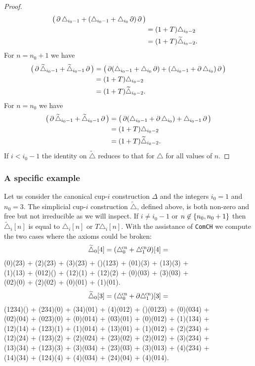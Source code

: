 \begin{proof}
\begin{align*}
		\big(\operatorname{\partial}\triangle_{i_0-1} + (\triangle_{i_0-1} + \triangle_{i_0} \operatorname{\partial})\operatorname{\partial}\big) \\ &=
		(1+T)\triangle_{i_0-2} \\ &=
		(1+T)\widetilde\triangle_{i_0-2}.
	\end{align*}
	For $n = n_0+1$ we have
	\begin{align*}
		\big(\operatorname{\partial}\widetilde\triangle_{i_0-1} + \widetilde\triangle_{i_0-1} \operatorname{\partial}\big) &=
		\big(\operatorname{\partial}(\triangle_{i_0-1} + \triangle_{i_0} \operatorname{\partial}) + (\triangle_{i_0-1} + \operatorname{\partial}\triangle_{i_0})\operatorname{\partial} \big) \\ &=
		(1+T)\triangle_{i_0-2} \\ &=
		(1+T)\widetilde\triangle_{i_0-2}.
	\end{align*}
	For $n = n_0$ we have
	\begin{align*}
		\big(\operatorname{\partial}\widetilde\triangle_{i_0-1} + \widetilde\triangle_{i_0-1} \operatorname{\partial}\big) &=
		\big(\operatorname{\partial}(\triangle_{i_0-1} + \operatorname{\partial}\triangle_{i_0}) + \triangle_{i_0-1}\operatorname{\partial} \big) \\ &=
		(1+T)\triangle_{i_0-2} \\ &=
		(1+T)\widetilde\triangle_{i_0-2}.
	\end{align*}
	If $i<i_0-1$ the identity on $\widetilde\triangle$ reduces to that for $\triangle$ for all values of $n$.
\end{proof}

\subsubsection{A specific example}

Let us consider the canonical \mbox{cup-$i$} construction $\Delta$ and the integers $i_0=1$ and $n_0=3$.
The simplicial \mbox{cup-$i$} construction $\widetilde\triangle$, defined above, is both non-zero and free but not irreducible as we will inspect.
If $i \neq i_0-1$ or $n \not\in \{n_0,n_0+1\}$ then $\widetilde\triangle_i[n]$ is equal to $\triangle_i[n]$ or $T\triangle_i[n]$.
With the assistance of \texttt{ComCH} we compute the two cases where the axioms could be broken:
\[
\widetilde\triangle_0[4] = (\triangle^{\!\mathrm{cn}}_0 + \triangle^{\!\mathrm{cn}}_1\partial)[4] =
\]
\noindent
{\ttfamily
	(0)(23) + (2)(23) + (3)(23) + ()(123) + (01)(3) + (13)(3) +\\
	(1)(13) + (012)() + (12)(1) + (12)(2) + (0)(03) + (3)(03) +\\
	(02)(0) + (2)(02) + (0)(01) + (1)(01).}
\[
\widetilde\triangle_0[3] = (\triangle^{\!\mathrm{cn}}_0 + \partial\triangle^{\!\mathrm{cn}}_1)[3] =
\]
\noindent
{\ttfamily
	(1234)() + (234)(0) + (34)(01) + (4)(012) + ()(0123) + (0)(034) +\\
	(02)(04) + (023)(0) + (0)(014) + (03)(01) + (0)(012) + (1)(134) +\\
	(12)(14) + (123)(1) + (1)(014) + (13)(01) + (1)(012) + (2)(234) +\\
	(12)(24) + (123)(2) + (2)(024) + (23)(02) + (2)(012) + (3)(234) +\\
	(13)(34) + (123)(3) + (3)(034) + (23)(03) + (3)(013) + (4)(234) +\\
	(14)(34) + (124)(4) + (4)(034) + (24)(04) + (4)(014).}

